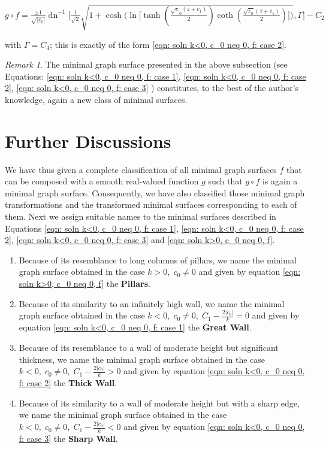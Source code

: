 \documentclass[12pt]{article}
\theoremstyle{plain}
\theoremstyle{definition}
\theoremstyle{remark}
\newtheorem{remark}[theorem]{Remark}
\begin{document}
  \(
  g\circ f=\tfrac{\pm1}{\sqrt{|c_0|}}\operatorname{dn}^{-1}\!\Big[\tfrac{1}{\sqrt{2}}\sqrt{1 + \cosh\!\big(\ln\!\big[\tanh(\tfrac{\sqrt c_0(z+c_1)}{2})\coth(\tfrac{\sqrt{\bar c_0}(\bar z+\bar c_1)}{2})\big]\big)},\Gamma\Big]-C_2
  \)
  
  \noindent
  with \(\Gamma=C_4\); this is exactly of the form \ref{eqn: soln k<0, c_0 neq 0, f: case 2}.
  
  \begin{remark}
  	The minimal graph surface presented in the above subsection (see Equations: \ref{eqn: soln k<0, c_0 neq 0, f: case 1}, \ref{eqn: soln k<0, c_0 neq 0, f: case 2}, \ref{eqn: soln k<0, c_0 neq 0, f: case 3} ) constitutes, to the best of the author's knowledge, again a new class of minimal surfaces.
  \end{remark}
  
  \section{Further Discussions}
  
  We have thus given a complete classification of all minimal graph surfaces \(f\) that can be composed with a smooth real‑valued function \(g\) such that \(g\circ f\) is again a minimal graph surface. Consequently, we have also classified those minimal graph transformations and the transformed minimal surfaces corresponding to each of them. Next we assign suitable names to the minimal surfaces described in Equations \ref{eqn: soln k<0, c_0 neq 0, f: case 1}, \ref{eqn: soln k<0, c_0 neq 0, f: case 2}, \ref{eqn: soln k<0, c_0 neq 0, f: case 3} and \ref{eqn: soln k>0, c_0 neq 0, f}.
  
\begin{enumerate}
	\item Because of its resemblance to long columns of pillars, we name the minimal graph surface obtained in the case \(k>0,\; c_0\neq 0\) and given by equation \ref{eqn: soln k>0, c_0 neq 0, f} the \textbf{Pillars}.
	\item Because of its similarity to an infinitely high wall, we name the minimal graph surface obtained in the case \(k<0,\; c_0\neq 0,\; C_1-\tfrac{2|c_0|}{k}=0\) and given by equation \ref{eqn: soln k<0, c_0 neq 0, f: case 1} the \textbf{Great Wall}.
	\item Because of its resemblance to a wall of moderate height but significant thickness, we name the minimal graph surface obtained in the case \(k<0,\; c_0\neq 0,\; C_1-\tfrac{2|c_0|}{k}>0\) and given by equation \ref{eqn: soln k<0, c_0 neq 0, f: case 2} the \textbf{Thick Wall}.
	\item Because of its similarity to a wall of moderate height but with a sharp edge, we name the minimal graph surface obtained in the case \(k<0,\; c_0\neq 0,\; C_1-\tfrac{2|c_0|}{k}<0\) and given by equation \ref{eqn: soln k<0, c_0 neq 0, f: case 3} the \textbf{Sharp Wall}.
\end{enumerate}
\end{document}
